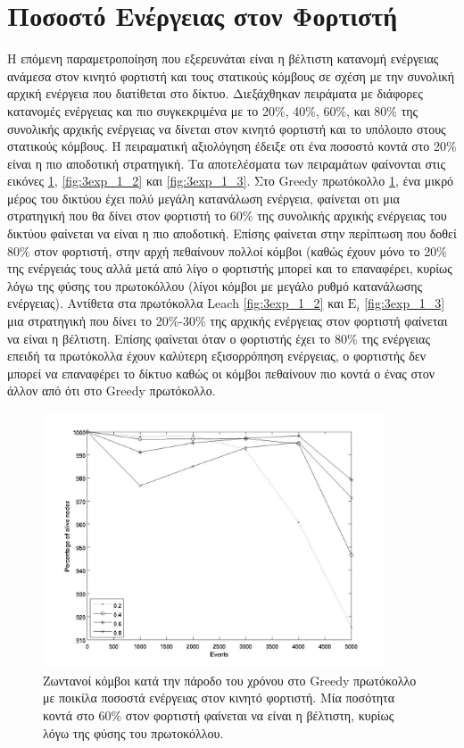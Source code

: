 \section{Ποσοστό Ενέργειας στον Φορτιστή}
H επόμενη παραμετροποίηση που εξερευνάται είναι η βέλτιστη κατανομή ενέργειας ανάμεσα στον κινητό φορτιστή και τους στατικούς κόμβους σε σχέση με την συνολική αρχική
ενέργεια που διατίθεται στο δίκτυο. Διεξάχθηκαν πειράματα με διάφορες κατανομές ενέργειας και πιο συγκεκριμένα με το 20\%, 40\%, 60\%, και 80\% της συνολικής αρχικής
ενέργειας να δίνεται στον κινητό φορτιστή και το υπόλοιπο στους στατικούς κόμβους. Η πειραματική αξιολόγηση έδειξε οτι ένα ποσοστό κοντά στο 20\% είναι η πιο
αποδοτική στρατηγική. Τα αποτελέσματα των πειραμάτων φαίνονται στις εικόνες \ref{fig:3exp_1_1}, \ref{fig:3exp_1_2} και \ref{fig:3exp_1_3}. Στο Greedy
πρωτόκολλο \ref{fig:3exp_1_1}, ένα μικρό μέρος του δικτύου έχει πολύ μεγάλη κατανάλωση ενέργεια, φαίνεται οτι μια στρατηγική που θα δίνει στον φορτιστή το 60\% της
συνολικής αρχικής ενέργειας του δικτύου φαίνεται να είναι η πιο αποδοτική. Επίσης φαίνεται στην περίπτωση που δοθεί 80\% στον φορτιστή, στην αρχή πεθαίνουν πολλοί
κόμβοι (καθώς έχουν μόνο το 20\% της ενέργειάς τους αλλά μετά από λίγο ο φορτιστής μπορεί και το επαναφέρει, κυρίως λόγω της φύσης του πρωτοκόλλου (λίγοι κόμβοι με
μεγάλο ρυθμό κατανάλωσης ενέργειας). Αντίθετα στα πρωτόκολλα Leach \ref{fig:3exp_1_2} και $\text{E}_{i}$ \ref{fig:3exp_1_3} μια στρατηγική που δίνει το 20\%-30\% της
αρχικής ενέργειας στον φορτιστή φαίνεται να είναι η βέλτιστη. Επίσης φαίνεται όταν ο φορτιστής έχει το 80\% της ενέργειας επειδή τα πρωτόκολλα έχουν καλύτερη
εξισορρόπηση ενέργειας, ο φορτιστής δεν μπορεί να επαναφέρει το δίκτυο καθώς οι κόμβοι πεθαίνουν πιο κοντά ο ένας στον άλλον από ότι στο Greedy πρωτόκολλο.



\begin{figure}[H]
  \centering
  \includegraphics[width=0.9\textwidth]{experiments/classic/3.smallVSbigpercentage/alive_nodes_greedy_rc_per_our-0-0.2-0.4-0.6-0.8.jpg}
  \caption{Ζωντανοί κόμβοι κατά την πάροδο του χρόνου στο Greedy πρωτόκολλο με ποικίλα ποσοστά ενέργειας στον κινητό φορτιστή. Μία ποσότητα κοντά στο 60\% στον
φορτιστή 
  φαίνεται να είναι η βέλτιστη, κυρίως λόγω της φύσης του πρωτοκόλλου.}
  \label{fig:3exp_1_1}
\end{figure}

